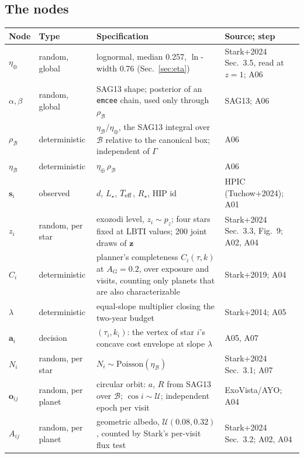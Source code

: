 \documentclass[11pt,a4paper]{article}
\begin{document}
\subsection{The nodes}

\begin{table}[htbp]
\centering
\scriptsize
\begin{tabular}{p{1.2cm}p{3.2cm}p{5.6cm}p{3.6cm}}
\toprule
\textbf{Node} & \textbf{Type} & \textbf{Specification} & \textbf{Source; step} \\
\midrule
$\eta_\oplus$ & random, global & lognormal, median 0.257, $\ln$-width 0.76 (Sec.~\ref{sec:eta}) & Stark+2024 Sec.~3.5, read at $z=1$; A06 \\
$\alpha,\beta$ & random, global & SAG13 shape; posterior of an \texttt{emcee} chain, used only through $\rho_\mathcal{B}$ & SAG13; A06 \\
$\rho_\mathcal{B}$ & deterministic & $\eta_\mathcal{B}/\eta_\oplus$, the SAG13 integral over $\mathcal{B}$ relative to the canonical box; independent of $\Gamma$ & A06 \\
$\eta_\mathcal{B}$ & deterministic & $\eta_\oplus\,\rho_\mathcal{B}$ & A06 \\
$\mathbf{s}_i$ & observed & $d$, $L_\star$, $T_{\rm eff}$, $R_\star$, HIP id & HPIC (Tuchow+2024); A01 \\
$z_i$ & random, per star & exozodi level, $z_i \sim p_z$; four stars fixed at LBTI values; 200 joint draws of $\mathbf{z}$ & Stark+2024 Sec.~3.3, Fig.~9; A02, A04 \\
$C_i$ & deterministic & planner's completeness $C_i(\tau, k)$ at $A_G = 0.2$, over exposure and visits, counting only planets that are also characterizable & Stark+2019; A04 \\
$\lambda$ & deterministic & equal-slope multiplier closing the two-year budget & Stark+2014; A05 \\
$\mathbf{a}_i$ & decision & $(\tau_i, k_i)$: the vertex of star $i$'s concave cost envelope at slope $\lambda$ & A05, A07 \\
$N_i$ & random, per star & $N_i \sim \mathrm{Poisson}(\eta_\mathcal{B})$ & Stark+2024 Sec.~3.1; A07 \\
$\mathbf{o}_{ij}$ & random, per planet & circular orbit: $a$, $R$ from SAG13 over $\mathcal{B}$; $\cos i \sim \mathcal{U}$; independent epoch per visit & ExoVista/AYO; A04 \\
$A_{ij}$ & random, per planet & geometric albedo, $\mathcal{U}(0.08, 0.32)$, counted by Stark's per-visit flux test & Stark+2024 Sec.~3.2; A02, A04 \\

\end{tabular}
\end{table}
\end{document}
